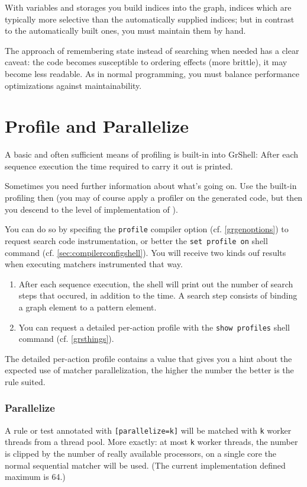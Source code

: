 With variables and storages you build indices into the graph, indices which are typically more selective than the automatically supplied indices; 
but in contrast to the automatically built ones, you must maintain them by hand.

The approach of remembering state instead of searching when needed has a clear caveat: the code becomes susceptible to ordering effects (more brittle), it may become less readable. As in normal programming, you must balance performance optimizations against maintainability.


\section{Profile and Parallelize}\label{sec:performanceparallel}

A basic and often sufficient means of profiling is built-in into GrShell:
After each sequence execution the time required to carry it out is printed.

Sometimes you need further information about what's going on.
Use the built-in profiling then (you may of course apply a profiler on the generated code, but then you descend to the level of implementation of \GrG{}).

You can do so by specifing the \texttt{profile} compiler option (cf. \ref{grgenoptions}) to request search code instrumentation, or better the \texttt{set profile on} shell command (cf. \ref{sec:compilerconfigshell}).
You will receive two kinds ouf results when executing matchers instrumented that way.

\begin{enumerate}
	\item After each sequence execution, the shell will print out the number of search steps that occured, in addition to the time. A search step consists of binding a graph element to a pattern element.
	\item You can request a detailed per-action profile with the \texttt{show profiles} shell command (cf. \ref{grsthings}).
\end{enumerate}

The detailed per-action profile contains a value that gives you a hint about the expected use of matcher parallelization, the higher the number the better is the rule suited.

\subsubsection*{Parallelize}
A rule or test annotated with \texttt{[parallelize=k]} will be matched with \texttt{k} worker threads from a thread pool.
More exactly: at most \texttt{k} worker threads, the number is clipped by the number of really available processors, on a single core the normal sequential matcher will be used.
(The current implementation defined maximum is 64.)

